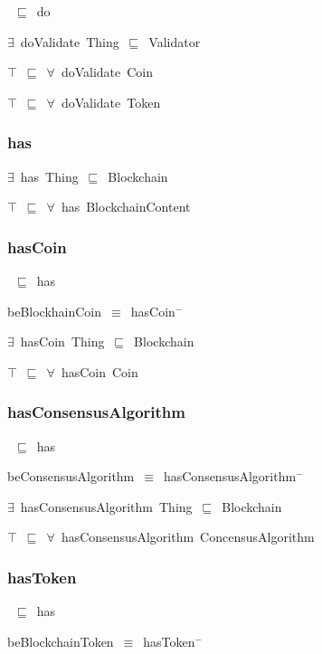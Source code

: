 \documentclass{article}
\begin{document}
~\ensuremath{\sqsubseteq}~do

\ensuremath{\exists}~doValidate~Thing~\ensuremath{\sqsubseteq}~Validator

\ensuremath{\top}~\ensuremath{\sqsubseteq}~\ensuremath{\forall}~doValidate~Coin

\ensuremath{\top}~\ensuremath{\sqsubseteq}~\ensuremath{\forall}~doValidate~Token

\subsubsection*{has}

\ensuremath{\exists}~has~Thing~\ensuremath{\sqsubseteq}~Blockchain

\ensuremath{\top}~\ensuremath{\sqsubseteq}~\ensuremath{\forall}~has~BlockchainContent

\subsubsection*{hasCoin}

~\ensuremath{\sqsubseteq}~has

beBlockhainCoin~\ensuremath{\equiv}~hasCoin\ensuremath{^-}

\ensuremath{\exists}~hasCoin~Thing~\ensuremath{\sqsubseteq}~Blockchain

\ensuremath{\top}~\ensuremath{\sqsubseteq}~\ensuremath{\forall}~hasCoin~Coin

\subsubsection*{hasConsensusAlgorithm}

~\ensuremath{\sqsubseteq}~has

beConsensusAlgorithm~\ensuremath{\equiv}~hasConsensusAlgorithm\ensuremath{^-}

\ensuremath{\exists}~hasConsensusAlgorithm~Thing~\ensuremath{\sqsubseteq}~Blockchain

\ensuremath{\top}~\ensuremath{\sqsubseteq}~\ensuremath{\forall}~hasConsensusAlgorithm~ConcensusAlgorithm

\subsubsection*{hasToken}

~\ensuremath{\sqsubseteq}~has

beBlockchainToken~\ensuremath{\equiv}~hasToken\ensuremath{^-}
\end{document}
